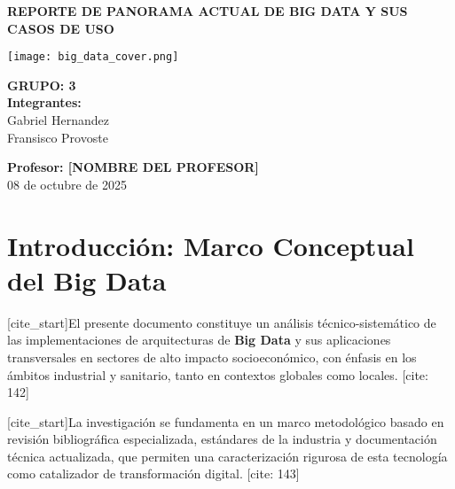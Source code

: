 \documentclass[12pt, a4paper]{article}
\begin{document}
\begin{titlepage}
    \centering
    \vspace*{1cm}
    
    {\Huge \bfseries REPORTE DE PANORAMA ACTUAL DE BIG DATA Y SUS CASOS DE USO}
    
    \vspace{1.5cm}
    
    \texttt{[image: big\_data\_cover.png]}
    
    \vspace{2cm}
    
    {\large \bfseries GRUPO: 3} \\
    \vspace{0.5cm}
    {\large \bfseries Integrantes:} \\
    {\large Gabriel Hernandez \\ Fransisco Provoste}
    
    \vfill %
    
    {\large \bfseries Profesor: [NOMBRE DEL PROFESOR]} \\ %
    \vspace{0.5cm}
    {\large 08 de octubre de 2025}
    
\end{titlepage}

\tableofcontents
\newpage


\section{Introducción: Marco Conceptual del Big Data}
[cite_start]El presente documento constituye un análisis técnico-sistemático de las implementaciones de arquitecturas de \textbf{Big Data} y sus aplicaciones transversales en sectores de alto impacto socioeconómico, con énfasis en los ámbitos industrial y sanitario, tanto en contextos globales como locales. [cite: 142]

[cite_start]La investigación se fundamenta en un marco metodológico basado en revisión bibliográfica especializada, estándares de la industria y documentación técnica actualizada, que permiten una caracterización rigurosa de esta tecnología como catalizador de transformación digital. [cite: 143]
\end{document}
